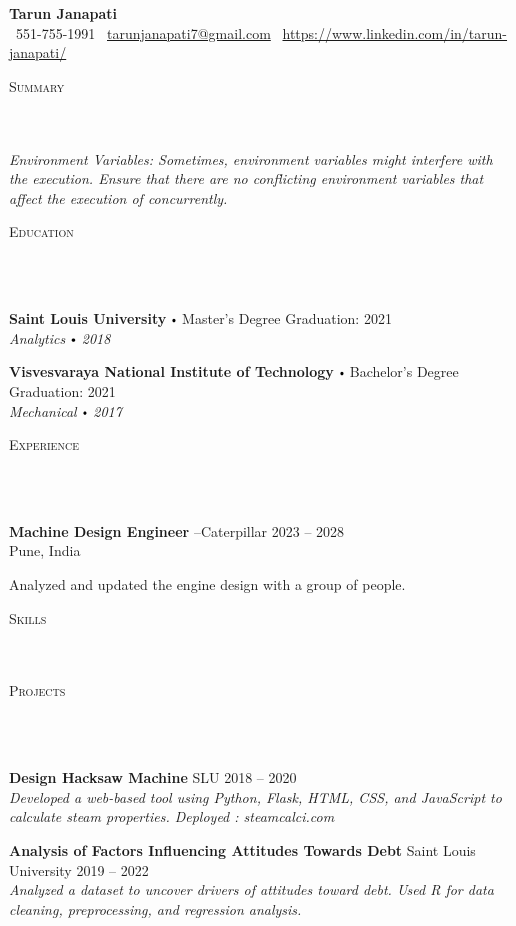 \documentclass{article}
\newcommand{\school}[4]{
      \textbf{#1} \labelitemi #2 \hfill #3 \\ #4 \vspace*{5pt}
    }
\newcommand{\employer}[4]{{
      \vspace*{2pt}%
      \textbf{#1} #2 \hfill #3\\ #4 \vspace*{2pt}}
      }
\newcommand{\project}[4]{{
        \vspace*{2pt}%
        \textbf{#1} #2 \hfill #3\\ \textit{#4} \vspace*{2pt}}
        }
\newcommand{\lineunder}{
      \vspace*{-8pt} \\ \hspace*{-18pt} 
      \hrulefill \\
      }
\newcommand{\header}[1]{{
      \hspace*{-15pt}\vspace*{6pt} \textsc{#1}} \vspace*{-6pt} 
      \lineunder
      }
\renewcommand{\labelitemi}{
      $\vcenter{\hbox{\tiny$\bullet$}}$\hspace*{3pt}
      }
\renewcommand{\labelitemii}{
      $\vcenter{\hbox{\tiny$\bullet$}}$\hspace*{-3pt}
      }
\newenvironment{bullet-list-minor}{
        \begin{list}{\labelitemii}{\setlength\leftmargin{15pt} 
          \topsep 0pt \itemsep -2pt}}{\vspace*{4pt}\end{list}
          }
\begin{document}
    \small
    \smallskip
    \vspace*{-44pt}

    \begin{center}
      {\LARGE \textbf{Tarun Janapati}} \\
      \faPhone\ 551-755-1991 \quad
      \faEnvelope\ \href{mailto:tarunjanapati7@gmail.com}{tarunjanapati7@gmail.com} \quad
      \faLinkedin\ \url{https://www.linkedin.com/in/tarun-janapati/}
    \end{center}
   \vspace*{4pt}%
    \header{Summary}

    {
      \textit{Environment Variables: Sometimes, environment variables might interfere with the execution. Ensure that there are no conflicting environment variables that affect the execution of concurrently.}
      }

    \vspace{15pt}

   \header{Education}

    {
      \school{Saint Louis University}{Master's Degree}{Graduation: 2021}{\textit{Analytics \labelitemi 2018}}
      

      \school{Visvesvaraya National Institute of Technology}{Bachelor's Degree}{Graduation: 2021}{\textit{Mechanical \labelitemi 2017}}
      }

    \vspace*{4pt}%
    \header{Experience}

    {
        \employer{Machine Design Engineer}{--Caterpillar}{2023 -- 2028}{Pune, India}
        \begin{bullet-list-minor}
	      \item Analyzed and updated the engine design with a group of people.
        \end{bullet-list-minor}
       
      }
    \vspace*{4pt}%
    \header{Skills}

    \vspace*{4pt}%
    \header{Projects}
    {
      \project{Design Hacksaw Machine}{SLU}{2018 -- 2020}{Developed a web-based tool using Python, Flask, HTML, CSS, and JavaScript to calculate steam properties.
Deployed : steamcalci.com}
      

      \project{Analysis of Factors Influencing Attitudes Towards Debt}{Saint Louis University}{2019 -- 2022}{Analyzed a dataset to uncover drivers of attitudes toward debt. Used R for data cleaning, preprocessing, and
regression analysis.}
      }
\end{document}

